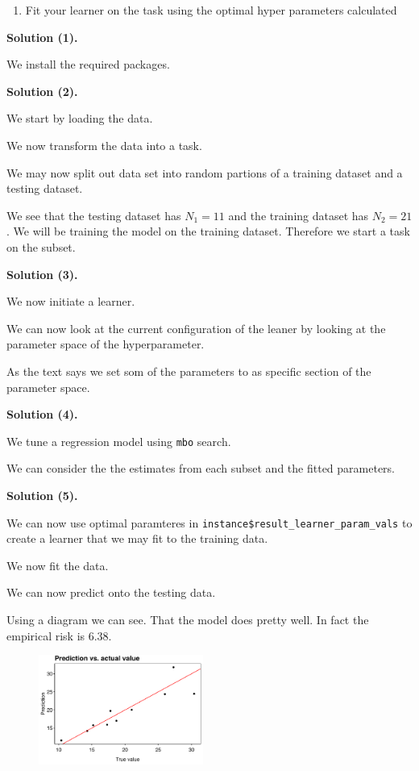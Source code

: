 \documentclass[a4paper,12pt,openany]{book}
\providecommand{\tightlist}{%
 \setlength{\itemsep}{0pt}\setlength{\parskip}{0pt}}
\begin{document}
\begin{enumerate}
\def\labelenumi{\arabic{enumi}.}
\setcounter{enumi}{4}
\tightlist
\item
  Fit your learner on the task using the optimal hyper parameters calculated
\end{enumerate}

\textbf{Solution (1).}

We install the required packages.

\textbf{Solution (2).}

We start by loading the data.

We now transform the data into a task.

We may now split out data set into random partions of a training dataset and a testing dataset.

We see that the testing dataset has \(N_1=11\) and the training dataset has \(N_2=21\). We will be training the model on the training dataset. Therefore we start a task on the subset.

\textbf{Solution (3).}

We now initiate a learner.

We can now look at the current configuration of the leaner by looking at the parameter space of the hyperparameter.

As the text says we set som of the parameters to as specific section of the parameter space.

\textbf{Solution (4).}

We tune a regression model using \texttt{mbo} search.

We can consider the the estimates from each subset and the fitted parameters.

\textbf{Solution (5).}

We can now use optimal paramteres in \texttt{instance\$result\_learner\_param\_vals} to create a learner that we may fit to the training data.

We now fit the data.

We can now predict onto the testing data.

Using a diagram we can see. That the model does pretty well. In fact the empirical risk is 6.38.

\begin{figure}[H]
  \begin{center}
    \includegraphics[width=0.48\textwidth]{figures/ML_week1_ex4.png}
  \end{center}
\end{figure}
\end{document}
